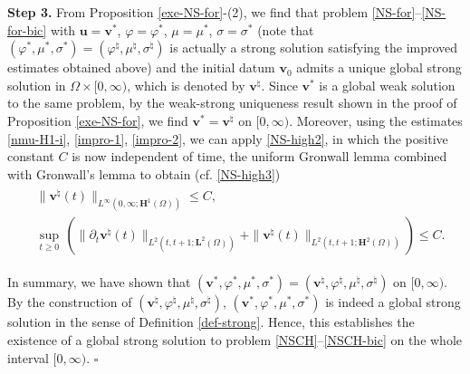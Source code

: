 \documentclass[11pt,reqno]{amsart}
\def\H{\bm{H}}
\def\uu{\bm{u}}
\def\vv{\bm{v}}
\begin{document}
\textbf{Step 3.} From Proposition \ref{exe-NS-for}-(2), we find that problem \eqref{NS-for}--\eqref{NS-for-bic} with $\uu=\vv^*$, $\varphi=\varphi^*$, $\mu=\mu^*$, $\sigma=\sigma^*$ (note that $(\varphi^*, \mu^*, \sigma^*)= (\varphi^\natural, \mu^\natural, \sigma^\natural)$ is actually a strong solution satisfying the improved estimates obtained above) and the initial datum $\vv_0$ admits a unique global strong solution in $\Omega\times [0,\infty)$, which is denoted by $\vv^\natural$. Since $\vv^*$ is a global weak solution to the same problem, by the weak-strong uniqueness result shown in the proof of Proposition \ref{exe-NS-for}, we find $\vv^*=\vv^\natural$ on $[0,\infty)$. Moreover, using the estimates \eqref{nmu-H1-i}, \eqref{impro-1}, \eqref{impro-2}, we can apply \eqref{NS-high2}, in which the positive constant $C$ is now independent of time, the uniform Gronwall lemma combined with Gronwall's lemma to obtain (cf. \eqref{NS-high3})
%
\begin{align}
\begin{split}
&\|\vv^\natural(t)\|_{L^\infty(0,\infty;\H^1(\Omega))}\leq C,
\\
&\sup_{t\geq 0} \,(\|\partial_t\vv^\natural(t)\|_{L^2(t,t+1;\bm{L}^2(\Omega))}
+ \|\vv^\natural(t)\|_{L^2(t,t+1;\H^2(\Omega))})\leq C.
\end{split}
\label{vv-hi-str}
\end{align}
%

In summary, we have shown that $(\vv^*,\varphi^*, \mu^*, \sigma^*)= (\vv^\natural,\varphi^\natural, \mu^\natural, \sigma^\natural)$ on $[0,\infty)$.
By the construction of $(\vv^\natural,\varphi^\natural, \mu^\natural, \sigma^\natural)$, $(\vv^*,\varphi^*, \mu^*, \sigma^*)$ is indeed a global strong solution in the sense of Definition \ref{def-strong}. Hence, this establishes the existence of a global strong solution to problem \eqref{NSCH}--\eqref{NSCH-bic} on the whole interval $[0,\infty)$.
\hfill $\square$
\end{document}
